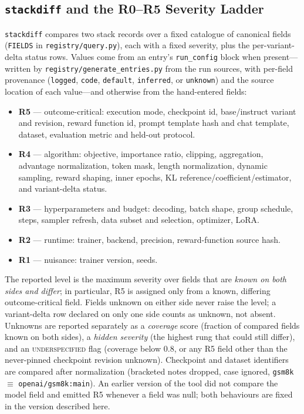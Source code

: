 \subsection{\texttt{stackdiff} and the R0--R5 Severity Ladder}
\label{sec:p6-stackdiff}
\texttt{stackdiff} compares two stack records over a fixed catalogue of
\NFIELDS{} canonical fields (\texttt{FIELDS} in \texttt{registry/query.py}),
each with a fixed severity, plus the per-variant-delta status rows. Values come
from an entry's \texttt{run\_config} block when present---written by
\texttt{registry/generate\_entries.py} from the run sources, with per-field
provenance (\texttt{logged}, \texttt{code}, \texttt{default},
\texttt{inferred}, or \texttt{unknown}) and the source location of each
value---and otherwise from the hand-entered fields:
\begin{itemize}[leftmargin=1.5em, itemsep=0.1em]
  \item \textbf{R5} --- outcome-critical: execution mode, checkpoint id,
        base/instruct variant and revision, reward function id, prompt
        template hash and chat template, dataset, evaluation metric and
        held-out protocol.
  \item \textbf{R4} --- algorithm: objective, importance ratio, clipping,
        aggregation, advantage normalization, token mask, length
        normalization, dynamic sampling, reward shaping, inner epochs, KL
        reference/coefficient/estimator, and variant-delta status.
  \item \textbf{R3} --- hyperparameters and budget: decoding, batch shape,
        group schedule, steps, sampler refresh, data subset and selection,
        optimizer, LoRA.
  \item \textbf{R2} --- runtime: trainer, backend, precision, reward-function
        source hash.
  \item \textbf{R1} --- nuisance: trainer version, seeds.
\end{itemize}
The reported level is the maximum severity over fields that are \emph{known
on both sides and differ}; in particular, R5 is assigned only from a known,
differing outcome-critical field. Fields unknown on either side never raise
the level; a variant-delta row declared on only one side counts as unknown,
not absent. Unknowns are reported separately as a \emph{coverage} score (fraction
of compared fields known on both sides), a \emph{hidden severity} (the highest
rung that could still differ), and an \textsc{underspecified} flag (coverage
below $0.8$, or any R5 field other than the never-pinned checkpoint revision
unknown). Checkpoint and dataset identifiers are compared after normalization
(bracketed notes dropped, case ignored, \texttt{gsm8k} $\equiv$
\texttt{openai/gsm8k:main}). An earlier version of the tool did not compare
the model field and emitted R5 whenever a field was null; both behaviours are
fixed in the version described here.


